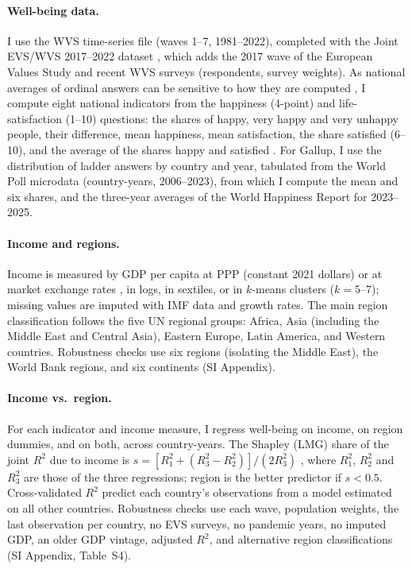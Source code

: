 \documentclass[10pt]{article}
\providecommand{\SIref}[3]{#2}
\begin{document}
\paragraph{Well-being data.} I use the WVS time-series file \citep{wvs_trend_2022} (waves 1--7, 1981--2022), completed with the Joint EVS/WVS 2017--2022 dataset \citep{evs_wvs_joint_2024}, which adds the 2017 wave of the European Values Study and recent WVS surveys (\nWVSRespondents respondents, survey weights). As national averages of ordinal answers can be sensitive to how they are computed \citep{bond_sad_2019,kaiser_scientific_2022}, I compute eight national indicators from the happiness (4-point) and life-satisfaction (1--10) questions: the shares of happy, very happy and very unhappy people, their difference, mean happiness, mean satisfaction, the share satisfied (6--10), and the average of the shares happy and satisfied \citep{inglehart_genes_2000}. For Gallup, I use the distribution of ladder answers by country and year, tabulated from the World Poll microdata (\nGallupCountryYears country-years, 2006--2023), from which I compute the mean and six shares, and the three-year averages of the World Happiness Report \citep{whr_2026} for 2023--2025.

\paragraph{Income and regions.} Income is measured by GDP per capita at PPP (constant 2021 dollars) or at market exchange rates \citep{worldbank_wdi_2026}, in logs, in sextiles, or in $k$-means clusters ($k = 5$--7); missing values are imputed with IMF data \citep{imf_weo_2026} and growth rates. The main region classification follows the five UN regional groups: Africa, Asia (including the Middle East and Central Asia), Eastern Europe, Latin America, and Western countries. Robustness checks use six regions (isolating the Middle East), the World Bank regions, and six continents (SI Appendix).

\paragraph{Income vs.\ region.} For each indicator and income measure, I regress well-being on income, on region dummies, and on both, across country-years. The Shapley (LMG) share of the joint $R^2$ due to income is $s = [R^2_1 + (R^2_3 - R^2_2)]/(2R^2_3)$ \citep{lindeman_introduction_1980,gromping_estimators_2007}, where $R^2_1$, $R^2_2$ and $R^2_3$ are those of the three regressions; region is the better predictor if $s < 0.5$. Cross-validated $R^2$ predict each country's observations from a model estimated on all other countries. Robustness checks use each wave, population weights, the last observation per country, no EVS surveys, no pandemic years, no imputed GDP, an older GDP vintage, adjusted $R^2$, and alternative region classifications (SI Appendix, Table~\SIref{tab:robustness}{S4}{Materials and Methods}).
\end{document}

